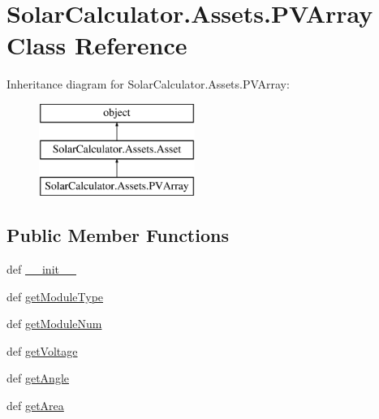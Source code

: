 \hypertarget{class_solar_calculator_1_1_assets_1_1_p_v_array}{\section{Solar\-Calculator.\-Assets.\-P\-V\-Array Class Reference}
\label{class_solar_calculator_1_1_assets_1_1_p_v_array}
}
Inheritance diagram for Solar\-Calculator.\-Assets.\-P\-V\-Array\-:\begin{figure}[H]
\begin{center}
\leavevmode
\includegraphics[height=3.000000cm]{class_solar_calculator_1_1_assets_1_1_p_v_array}
\end{center}
\end{figure}
\subsection*{Public Member Functions}
\begin{DoxyCompactItemize}
\item 
def \hyperlink{class_solar_calculator_1_1_assets_1_1_p_v_array_a819305480c16213f9726f9a9c4ee1656}{\-\_\-\-\_\-init\-\_\-\-\_\-}
\item 
def \hyperlink{class_solar_calculator_1_1_assets_1_1_p_v_array_ace069c085cac4e6da4118677cbb57fa2}{get\-Module\-Type}
\item 
def \hyperlink{class_solar_calculator_1_1_assets_1_1_p_v_array_aa723d6b057e597a868cb35f7c59e669f}{get\-Module\-Num}
\item 
def \hyperlink{class_solar_calculator_1_1_assets_1_1_p_v_array_aad961e3732323ba41574cae7482c3313}{get\-Voltage}
\item 
def \hyperlink{class_solar_calculator_1_1_assets_1_1_p_v_array_a46ce37825709b91065013139843fcc3a}{get\-Angle}
\item 
def \hyperlink{class_solar_calculator_1_1_assets_1_1_p_v_array_ad891247d9a2296a02492fa93e6fb3d37}{get\-Area}
\end{DoxyCompactItemize}
